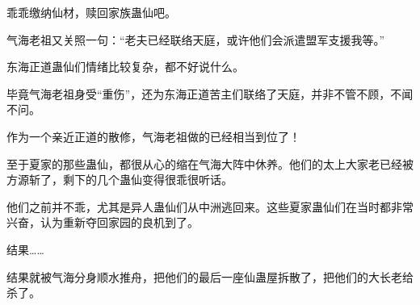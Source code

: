 \begin{this_body}
乖乖缴纳仙材，赎回家族蛊仙吧。

气海老祖又关照一句：“老夫已经联络天庭，或许他们会派遣盟军支援我等。”

东海正道蛊仙们情绪比较复杂，都不好说什么。

毕竟气海老祖身受“重伤”，还为东海正道苦主们联络了天庭，并非不管不顾，不闻不问。

作为一个亲近正道的散修，气海老祖做的已经相当到位了！

至于夏家的那些蛊仙，都很从心的缩在气海大阵中休养。他们的太上大家老已经被方源斩了，剩下的几个蛊仙变得很乖很听话。

他们之前并不乖，尤其是异人蛊仙们从中洲逃回来。这些夏家蛊仙们在当时都非常兴奋，认为重新夺回家园的良机到了。

结果……

结果就被气海分身顺水推舟，把他们的最后一座仙蛊屋拆散了，把他们的大长老给杀了。

\end{this_body}

